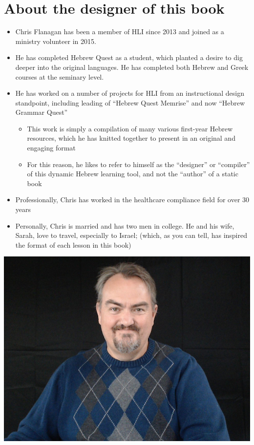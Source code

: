 \documentclass[
]{turabian-researchpaper}
\providecommand{\tightlist}{%
  \setlength{\itemsep}{0pt}\setlength{\parskip}{0pt}}
\begin{document}
\hypertarget{about-the-designer-of-this-book}{%
\section*{About the designer of this book}\label{about-the-designer-of-this-book}}

\begin{itemize}
\tightlist
\item
  Chris Flanagan has been a member of HLI since 2013 and joined as a ministry volunteer in 2015.
\item
  He has completed Hebrew Quest as a student, which planted a desire to dig deeper into the original languages. He has completed both Hebrew and Greek courses at the seminary level.
\item
  He has worked on a number of projects for HLI from an instructional design standpoint, including leading of ``Hebrew Quest Memrise'' and now ``Hebrew Grammar Quest''

  \begin{itemize}
  \tightlist
  \item
    This work is simply a compilation of many various first-year Hebrew resources, which he has knitted together to present in an original and engaging format
  \item
    For this reason, he likes to refer to himself as the ``designer'' or ``compiler'' of this dynamic Hebrew learning tool, and not the ``author'' of a static book
  \end{itemize}
\item
  Professionally, Chris has worked in the healthcare compliance field for over 30 years
\item
  Personally, Chris is married and has two men in college. He and his wife, Sarah, love to travel, especially to Israel; (which, as you can tell, has inspired the format of each lesson in this book)
\end{itemize}

\includegraphics{images/cf.jpg}
\end{document}
